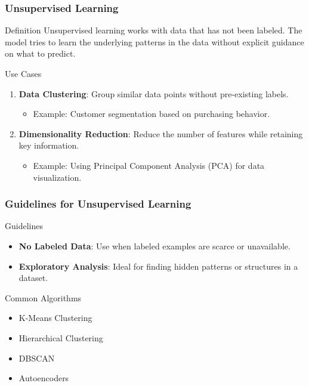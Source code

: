 \documentclass[aspectratio=169]{beamer}
\begin{document}
\begin{frame}[fragile]
    \frametitle{Unsupervised Learning}
    \begin{block}{Definition}
        Unsupervised learning works with data that has not been labeled. The model tries to learn the underlying patterns in the data without explicit guidance on what to predict.
    \end{block}
    \begin{block}{Use Cases}
        \begin{enumerate}
            \item \textbf{Data Clustering}: Group similar data points without pre-existing labels.
                \begin{itemize}
                    \item Example: Customer segmentation based on purchasing behavior.
                \end{itemize}
                
            \item \textbf{Dimensionality Reduction}: Reduce the number of features while retaining key information.
                \begin{itemize}
                    \item Example: Using Principal Component Analysis (PCA) for data visualization.
                \end{itemize}
        \end{enumerate}
    \end{block}
\end{frame}

\begin{frame}[fragile]
    \frametitle{Guidelines for Unsupervised Learning}
    \begin{block}{Guidelines}
        \begin{itemize}
            \item \textbf{No Labeled Data}: Use when labeled examples are scarce or unavailable.
            \item \textbf{Exploratory Analysis}: Ideal for finding hidden patterns or structures in a dataset.
        \end{itemize}
    \end{block}
    \begin{block}{Common Algorithms}
        \begin{itemize}
            \item K-Means Clustering
            \item Hierarchical Clustering
            \item DBSCAN
            \item Autoencoders
        \end{itemize}
    \end{block}
\end{frame}
\end{document}
